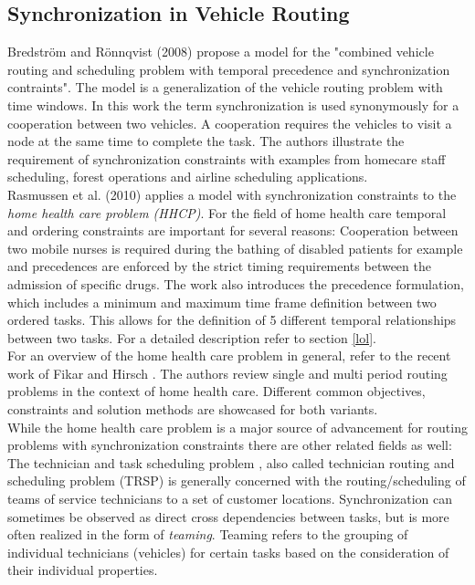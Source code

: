 \subsection{Synchronization in Vehicle Routing}\label{sec:vrp-syn}

Bredström and Rönnqvist (2008) \cite{bredstrom_combined_2008} propose a model for the "combined vehicle routing and scheduling problem with temporal precedence and synchronization contraints". The model is a generalization of the vehicle routing problem with time windows. In this work the term synchronization is used synonymously for a cooperation between two vehicles. A cooperation requires the vehicles to visit a node at the same time to complete the task. The authors illustrate the requirement of synchronization constraints with examples from homecare staff scheduling, forest operations and airline scheduling applications.\\
Rasmussen et al. (2010) \cite{rasmussen_home_2012} applies a model with synchronization constraints to the \textit{home health care problem (HHCP)}. For the field of home health care temporal and ordering constraints are important for several reasons: Cooperation between two mobile nurses is required during the bathing of disabled patients for example and precedences are enforced by the strict timing requirements between the admission of specific drugs. The work also introduces the precedence formulation, which includes a minimum and maximum time frame definition between two ordered tasks. This allows for the definition of 5 different temporal relationships between two tasks. For a detailed description refer to section \ref{lol}.\\
For an overview of the home health care problem in general, refer to the recent work of Fikar and Hirsch \cite{fikar_home_2017}. The authors review single and multi period routing problems in the context of home health care. Different common objectives, constraints and solution methods are showcased for both variants.\\
While the home health care problem is a major source of advancement for routing problems with synchronization constraints there are other related fields as well: The technician and task scheduling problem \cite{cordeau_scheduling_2010}, also called technician routing and scheduling problem (TRSP) \cite{pillac_technician_2011} is generally concerned with the routing/scheduling of teams of service technicians to a set of customer locations. Synchronization can sometimes be observed as direct cross dependencies between tasks, but is more often realized in the form of \textit{teaming}. Teaming refers to the grouping of individual technicians (vehicles) for certain tasks based on the consideration of their individual properties.\\
